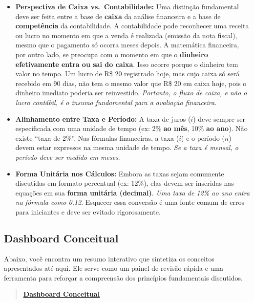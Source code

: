 \documentclass[
  a4paper,
]{book}
\begin{document}
\begin{tcolorbox}
\begin{itemize}
\item
  \textbf{Perspectiva de Caixa vs.~Contabilidade:} Uma distinção
  fundamental deve ser feita entre a base de \textbf{caixa} da análise
  financeira e a base de \textbf{competência} da contabilidade. A
  contabilidade pode reconhecer uma receita ou lucro no momento em que a
  venda é realizada (emissão da nota fiscal), mesmo que o pagamento só
  ocorra meses depois. A matemática financeira, por outro lado, se
  preocupa com o momento em que o \textbf{dinheiro efetivamente entra ou
  sai do caixa}. Isso ocorre porque o dinheiro tem valor no tempo. Um
  lucro de R\$ 20 registrado hoje, mas cujo caixa só será recebido em 90
  dias, não tem o mesmo valor que R\$ 20 em caixa hoje, pois o dinheiro
  imediato poderia ser reinvestido. \emph{Portanto, o fluxo de caixa, e
  não o lucro contábil, é o insumo fundamental para a avaliação
  financeira}.
\item
  \textbf{Alinhamento entre Taxa e Período:} A taxa de juros (\(i\))
  deve sempre ser especificada com uma unidade de tempo (ex: 2\%
  \textbf{ao mês}, 10\% \textbf{ao ano}). Não existe ``taxa de 2\%''.
  Nas fórmulas financeiras, a taxa (\(i\)) e o período (\(n\)) devem
  estar expressos na mesma unidade de tempo. \emph{Se a taxa é mensal, o
  período deve ser medido em meses}.
\item
  \textbf{Forma Unitária nos Cálculos:} Embora as taxas sejam comumente
  discutidas em formato percentual (ex: 12\%), elas devem ser inseridas
  nas equações em sua \textbf{forma unitária (decimal)}. \emph{Uma taxa
  de 12\% ao ano entra na fórmula como 0,12}. Esquecer essa conversão é
  uma fonte comum de erros para iniciantes e deve ser evitado
  rigorosamente.
\end{itemize}

\end{tcolorbox}

\subsection{Dashboard Conceitual}\label{dashboard-conceitual}

Abaixo, você encontra um resumo interativo que sintetiza os conceitos
apresentados até aqui. Ele serve como um painel de revisão rápida e uma
ferramenta para reforçar a compreensão dos princípios fundamentais
discutidos.

\begin{quote}
\href{./resources/01-intro-interativo.html}{\textbf{Dashboard
Conceitual}}
\end{quote}
\end{document}
